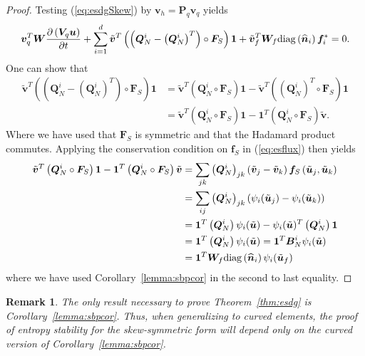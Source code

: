 \documentclass[review]{siamart0216}
\newtheorem*{remark}{Remark}
\theoremstyle{assumption}
\renewcommand{\hat}[1]{\hat{#1}}
\newcommand{\pd}[2]{\frac{\partial#1}{\partial#2}}
\newcommand{\LRp}[1]{\left( #1 \right)}
\renewcommand{\hat}{\widehat}
\newcommand{\diag}[1]{{\rm diag}\LRp{#1}}
\begin{document}
\begin{proof}
Testing (\ref{eq:esdgSkew}) by $\bm{v}_h = \bm{P}_q\bm{v}_q$ yields 
\begin{align}
\bm{v}_q^T\bm{W}\pd{\LRp{\bm{V}_q\bm{u}}}{t} + \sum_{i=1}^d
\tilde{\bm{v}}^T \LRp{\LRp{\bm{Q}^i_N - \LRp{\bm{Q}^i_N}^T} \circ \bm{F}_S}\bm{1} + \tilde{\bm{v}}_f^T \bm{W}_f \diag{\hat{\bm{n}}_i}\bm{f}_i^* = 0.
\end{align}
One can show that \cite{chan2017discretely}
\begin{align*}
\tilde{\bm{v}}^T \LRp{\LRp{\bm{Q}^i_N - \LRp{\bm{Q}^i_N}^T} \circ \bm{F}_S}\bm{1} &= \tilde{\bm{v}}^T \LRp{\bm{Q}^i_N \circ \bm{F}_S}\bm{1} - \tilde{\bm{v}}^T \LRp{\LRp{\bm{Q}^i_N}^T \circ \bm{F}_S}\bm{1}\\
&= \tilde{\bm{v}}^T \LRp{\bm{Q}^i_N \circ \bm{F}_S}\bm{1} - \bm{1}^T \LRp{{\bm{Q}^i_N} \circ \bm{F}_S}\tilde{\bm{v}}.
\end{align*}
Where we have used that $\bm{F}_S$ is symmetric and that the Hadamard product commutes.  Applying the conservation condition on $\bm{f}_S$ in (\ref{eq:esflux}) then yields
\begin{align*}
\tilde{\bm{v}}^T \LRp{\bm{Q}^i_N \circ \bm{F}_S}\bm{1} - \bm{1}^T \LRp{{\bm{Q}^i_N} \circ \bm{F}_S}\tilde{\bm{v}} &= \sum_{jk} \LRp{\bm{Q}^i_N}_{jk} \LRp{\tilde{\bm{v}}_j-\tilde{\bm{v}}_k} \bm{f}_S\LRp{\tilde{\bm{u}}_j,\tilde{\bm{u}}_k} \\
&= \sum_{ij} \LRp{\bm{Q}^i_N}_{jk} \LRp{\psi_i(\tilde{\bm{u}}_j) - \psi_i(\tilde{\bm{u}}_k)}\\
&= \bm{1}^T\LRp{\bm{Q}^i_N}\psi_i(\tilde{\bm{u}}) - \psi_i(\tilde{\bm{u}})^T\LRp{\bm{Q}^i_N}\bm{1} \\
&= \bm{1}^T\LRp{\bm{Q}^i_N}\psi_i(\tilde{\bm{u}}) = \bm{1}^T\bm{B}^i_N\psi_i(\tilde{\bm{u}}) \\
&= \bm{1}^T\bm{W}_f \diag{\hat{\bm{n}}_i} \psi_i(\tilde{\bm{u}}_f)
\end{align*}
where we have used Corollary~\ref{lemma:sbpcor} in the second to last equality.
\end{proof}

\begin{remark}
The only result necessary to prove Theorem~\ref{thm:esdg} is Corollary~\ref{lemma:sbpcor}.  Thus, when generalizing to curved elements, the proof of entropy stability for the skew-symmetric form will depend only on the curved version of Corollary~\ref{lemma:sbpcor}.
\end{remark}
\end{document}
